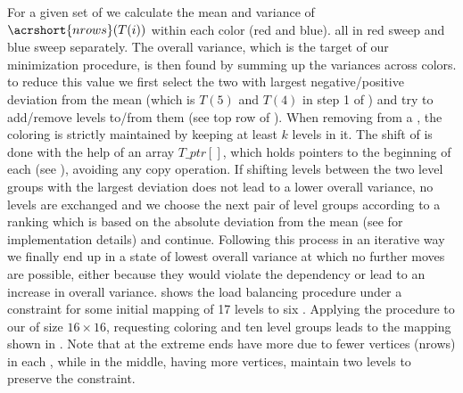 For a given set of \levelGroups we calculate the mean and variance of
$\acrshort{nrows}(T(i))$ within each color (red and blue).
all \levelGroups in red sweep and blue sweep separately.  The overall variance,
which is the target of our minimization procedure, is then found by summing up
the variances across colors. \Inorder to reduce this value we first select the
two \levelGroups with largest negative/positive deviation from the mean (which
is $T(5)$ and $T(4)$ in step 1 of ) and try to add/remove
levels to/from them (see top row of ). When
removing \levels from a \levelGroup, the \DK coloring is strictly maintained 
by keeping at least $k$ levels in it. The shift of
\levels is done with the help of an array  $T\_ptr[]$, which holds pointers to the
beginning of each \levelGroup (see ), avoiding any copy
operation. If shifting levels between the two level groups with the largest
deviation does not lead to a lower overall variance, no levels are exchanged and
we choose the next pair of level groups according to a ranking which is based on
the absolute deviation from the mean (see  for implementation
details) and continue. Following this process in an iterative way we finally end
up in a state of lowest overall variance at which no further moves are
possible, either because they would violate the \DK dependency or lead to
an increase in overall
variance.  shows the load balancing procedure under a \DTWO
constraint for some initial mapping of 17 levels to six \levelGroups. Applying
the procedure to our \stex of size $16 \times 16$, requesting \DTWO coloring and
ten level groups leads to the mapping shown in . Note that
\levelGroups at the extreme ends have more \levels due to fewer vertices
(\acrshort{nrows}) in each \level, while \levelGroups in the middle, having more
vertices, maintain two levels to preserve the \DTWO constraint.

  

